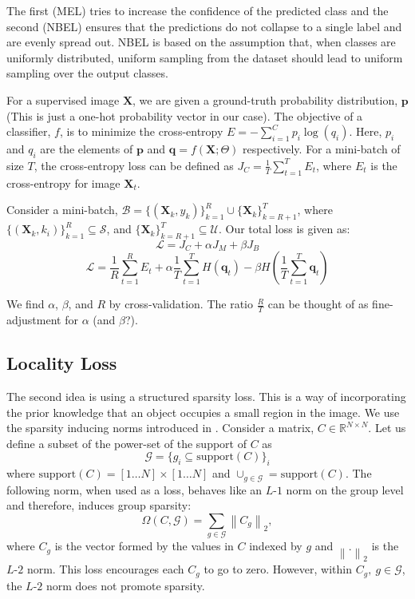 \documentclass[runningheads]{llncs}
\begin{document}
The first (MEL) tries to increase the confidence of the predicted class and the second (NBEL)
ensures that the predictions do not collapse to a single label and are evenly spread out. NBEL
is based on the assumption that, when classes are uniformly distributed, uniform sampling from the
dataset should lead to uniform sampling over the output classes.

For a supervised image $\mathbf X$, we are given a ground-truth probability distribution, $\mathbf{p}$ (This is
just a one-hot probability vector in our case). The objective of a classifier, $f$, is to minimize the
cross-entropy $E = -\sum_{i=1}^{C}p_i \log(q_i)$. Here, $p_i$ and $q_i$
are the elements of $\mathbf{p}$ and $\mathbf{q} = f(\mathbf{X}; \Theta)$ respectively. For a
mini-batch of size $T$, the cross-entropy loss can be defined as $J_C = \frac{1}{T} \sum_{t=1}^{T}
E_t$, where $E_t$ is the cross-entropy for image $\mathbf{X}_t$.

Consider a mini-batch, $\mathcal{B} =
\{(\mathbf{X}_k, y_k)\}_{k=1}^R \cup \{\mathbf{X}_k\}_{k=R+1}^T$, where $\{(\mathbf{X}_k,
k_i)\}_{k=1}^{R} \subseteq \mathcal{S}$, and $\{\mathbf{X}_k\}_{k=R+1}^{T} \subseteq \mathcal{U}$. Our total loss
is given as:
\begin{equation}
	\mathcal{L} = J_C + \alpha J_M + \beta J_B
\end{equation}
\begin{equation}
	\mathcal{L} = \frac{1}{R} \sum_{t=1}^{R} E_t + \alpha \frac{1}{T}\sum_{t=1}^{T}H(\mathbf{q}_t) -
	\beta H(\frac{1}{T}\sum_{t=1}^{T}\mathbf{q}_t)
\end{equation}

We find $\alpha$, $\beta$, and $R$ by cross-validation. The ratio $\frac{R}{T}$ can be thought of as
fine-adjustment for $\alpha$ (and $\beta$?).


\subsection{Locality Loss}
The second idea is using a structured sparsity loss. This is a way of incorporating the prior knowledge
that an object occupies a small region in the image. We use the sparsity inducing norms introduced in
\cite{groupsparsity,sparsepca}. Consider a matrix, $C \in \mathbb{R}^{N \times
N}$. Let us define a subset of the power-set of the support of $C$ as
\begin{equation}
	\mathcal{G} = \{g_i \subseteq \textrm{support}(C)\}_i
\end{equation}
where $\textrm{support}(C) = [1 \dots N] \times [1 \dots N]$ and $\cup_{g \in \mathcal{G}} = \textrm{support}(C)$. The following norm, when used as a
loss, behaves like an $L$-$1$ norm on the group level and therefore, induces group sparsity:
\begin{equation}
	\Omega (C, \mathcal{G}) = \sum_{g \in \mathcal{G}} \left\lVert C_g \right\rVert _2,
\end{equation}
where $C_g$ is the vector formed by the values in $C$ indexed by $g$ and $\left\lVert . \right\rVert_2$ is
the $L$-$2$ norm. This loss encourages each $C_g$ to go to zero. However, within $C_g,~g
\in \mathcal{G}$, the $L$-$2$ norm does not promote sparsity.
\end{document}
